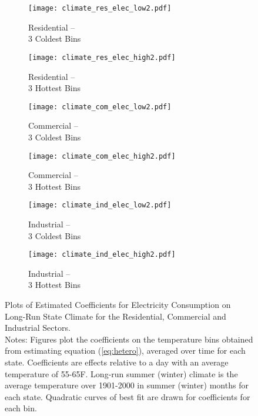 \documentclass[11pt]{article}
\begin{document}
	\begin{figure}
	\centering
	
	\begin{subfigure}{0.45\textwidth}
		\centering
  	
		\caption{Residential -- \\ 3 Coldest Bins}
		\label{fig:residential_low}
		\texttt{[image: climate\_res\_elec\_low2.pdf]}
	\end{subfigure} \hspace{0em}%
	\begin{subfigure}{0.45\textwidth}
		\centering
		\caption{Residential -- \\ 3 Hottest Bins}
		\label{fig:residential_high}
		\texttt{[image: climate\_res\_elec\_high2.pdf]}
	\end{subfigure}

 \begin{subfigure}{0.45\textwidth}
		\centering
  	
		\caption{Commercial -- \\ 3 Coldest Bins}
		\label{fig:commercial_low}
		\texttt{[image: climate\_com\_elec\_low2.pdf]}
	\end{subfigure} \hspace{0em}%
	\begin{subfigure}{0.45\textwidth}
		\centering
		\caption{Commercial -- \\ 3 Hottest Bins}
		\label{fig:commercial_high}
		\texttt{[image: climate\_com\_elec\_high2.pdf]}
	\end{subfigure}

 \begin{subfigure}{0.45\textwidth}
		\centering
  	
		\caption{Industrial -- \\ 3 Coldest Bins}
		\label{fig:industrial_low}
		\texttt{[image: climate\_ind\_elec\_low2.pdf]}
	\end{subfigure} \hspace{0em}%
	\begin{subfigure}{0.45\textwidth}
		\centering
		\caption{Industrial -- \\ 3 Hottest Bins}
		\label{fig:industrial_high}
		\texttt{[image: climate\_ind\_elec\_high2.pdf]}
	\end{subfigure}

	\caption{Plots of Estimated Coefficients for Electricity Consumption on Long-Run State Climate for the Residential, Commercial and Industrial Sectors. \\ {\small Notes: Figures plot the coefficients on the temperature bins obtained from estimating equation (\ref{eq:hetero}), averaged over time for each state. Coefficients are effects relative to a day with an average temperature of 55-65\degree F. Long-run summer (winter) climate is the average temperature over 1901-2000 in summer (winter) months for each state. Quadratic curves of best fit are drawn for coefficients for each bin.  
 }}
	\label{fig:electricity_res_climate}
\end{figure} 
\end{document}
